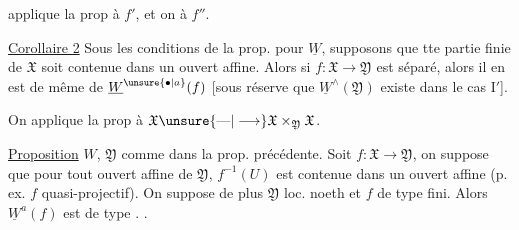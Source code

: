 applique la prop à $f'$, et on   à $f''$.

 \uline{Corollaire 2} Sous les conditions de la prop. pour $\underline W$,  supposons que  tte partie finie de $\mathfrak X$ soit contenue dans un ouvert affine. Alors si $f:\mathfrak X\to\mathfrak Y$ est séparé, alors il en est de même de $\underline W^{\unsure{\bullet|a}}(f)$ [sous réserve que $\underline W^\wedge(\mathfrak Y)$ existe dans le cas $\mathrm I'$].

On applique la prop à $\mathfrak X\unsure{\text{---}|\longrightarrow}\mathfrak X\times_{\mathfrak Y}\mathfrak X$.

\uline{Proposition} $W$,  $\mathfrak Y$ comme dans la prop. précédente. Soit $f:\mathfrak X\to\mathfrak Y$, on suppose   que pour tout ouvert affine  de $\mathfrak Y$,  $f^{-1}(U)$ est  contenue dans un ouvert affine (p. ex. $f$ quasi-projectif). On suppose de plus $\mathfrak Y$ loc. noeth et  $f$ de type fini.  Alors $\underline W^{a}(f)$ est de type  .
.
